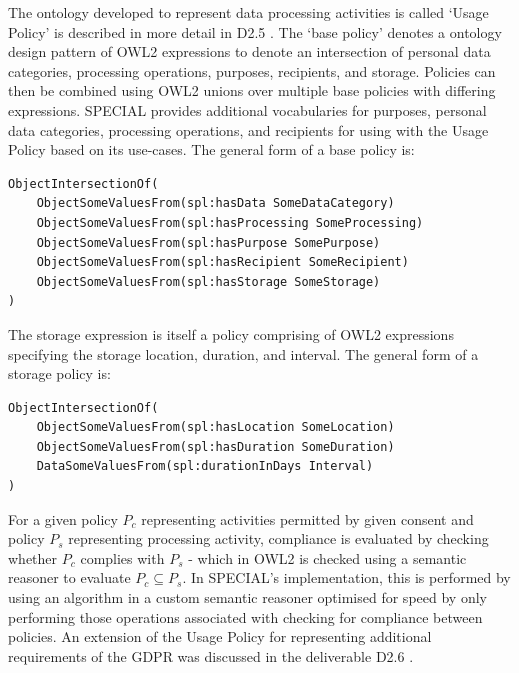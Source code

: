 The ontology developed to represent data processing activities is called `Usage Policy' \cite{bonatti_special_2018-2} is described in more detail in D2.5 \cite{bonatti_d2.5_2018}. The `base policy' denotes a ontology design pattern of OWL2 expressions to denote an intersection of personal data categories, processing operations, purposes, recipients, and storage. Policies can then be combined using OWL2 unions over multiple base policies with differing expressions. SPECIAL provides additional vocabularies for purposes, personal data categories, processing operations, and recipients for using with the Usage Policy based on its use-cases. The general form of a base policy is:
\begin{lstlisting}
ObjectIntersectionOf(
    ObjectSomeValuesFrom(spl:hasData SomeDataCategory)
    ObjectSomeValuesFrom(spl:hasProcessing SomeProcessing)
    ObjectSomeValuesFrom(spl:hasPurpose SomePurpose)
    ObjectSomeValuesFrom(spl:hasRecipient SomeRecipient)
    ObjectSomeValuesFrom(spl:hasStorage SomeStorage)
)
\end{lstlisting}
The storage expression is itself a policy comprising of OWL2 expressions specifying the storage location, duration, and interval. The general form of a storage policy is:
\begin{lstlisting}
ObjectIntersectionOf(
    ObjectSomeValuesFrom(spl:hasLocation SomeLocation)
    ObjectSomeValuesFrom(spl:hasDuration SomeDuration)
    DataSomeValuesFrom(spl:durationInDays Interval)
)
\end{lstlisting}

For a given policy $P_c$ representing activities permitted by given consent and policy $P_s$ representing processing activity, compliance is evaluated by checking whether $P_c$ complies with $P_s$ - which in OWL2 is checked using a semantic reasoner to evaluate $P_c \subseteq P_s$. In SPECIAL's implementation, this is performed by using an algorithm \cite{bonatti_fast_2018,bonatti_richer_2019} in a custom semantic reasoner optimised for speed by only performing those operations associated with checking for compliance between policies.
An extension of the Usage Policy for representing additional requirements of the GDPR was discussed in the deliverable D2.6 \cite{bonatti_d2.6_2018}.

